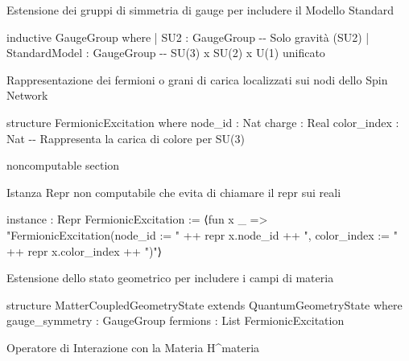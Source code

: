 \documentclass{article}
\newenvironment{Shaded}{%
  \begin{snugshade}%
}{%
  \end{snugshade}%
}%
\newenvironment{Highlighting}{%
}{%
}%
\newcommand{\NormalTok}[1]{#1}
\begin{document}
Estensione dei gruppi di simmetria di gauge per includere il Modello
Standard

\begin{Shaded}
\begin{Highlighting}[]
\NormalTok{inductive GaugeGroup where}
\NormalTok{  | SU2 : GaugeGroup                                    {-}{-} Solo gravità (SU2)}
\NormalTok{  | StandardModel : GaugeGroup                          {-}{-} SU(3) x SU(2) x U(1) unificato}

\end{Highlighting}
\end{Shaded}

Rappresentazione dei fermioni o grani di carica localizzati sui nodi
dello Spin Network

\begin{Shaded}
\begin{Highlighting}[]
\NormalTok{structure FermionicExcitation where}
\NormalTok{  node\_id : Nat}
\NormalTok{  charge : Real}
\NormalTok{  color\_index : Nat {-}{-} Rappresenta la carica di colore per SU(3)}

\NormalTok{noncomputable section}

\end{Highlighting}
\end{Shaded}

Istanza Repr non computabile che evita di chiamare il repr sui reali

\begin{Shaded}
\begin{Highlighting}[]
\NormalTok{instance : Repr FermionicExcitation := }
\NormalTok{  ⟨fun x \_ =\textgreater{} "FermionicExcitation(node\_id := " ++ repr x.node\_id ++ ", color\_index := " ++ repr x.color\_index ++ ")"⟩}

\end{Highlighting}
\end{Shaded}

Estensione dello stato geometrico per includere i campi di materia

\begin{Shaded}
\begin{Highlighting}[]
\NormalTok{structure MatterCoupledGeometryState extends QuantumGeometryState where}
\NormalTok{  gauge\_symmetry : GaugeGroup}
\NormalTok{  fermions : List FermionicExcitation}

\end{Highlighting}
\end{Shaded}

Operatore di Interazione con la Materia H\^{}materia
\end{document}
